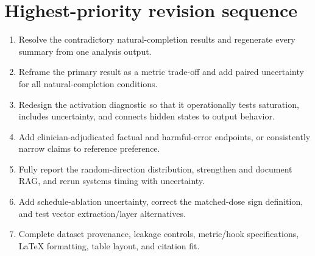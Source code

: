 \documentclass[11pt]{article}
\begin{document}
\section*{Highest-priority revision sequence}

\begin{enumerate}
    \item Resolve the contradictory natural-completion results and regenerate every summary from one analysis output.
    \item Reframe the primary result as a metric trade-off and add paired uncertainty for all natural-completion conditions.
    \item Redesign the activation diagnostic so that it operationally tests saturation, includes uncertainty, and connects hidden states to output behavior.
    \item Add clinician-adjudicated factual and harmful-error endpoints, or consistently narrow claims to reference preference.
    \item Fully report the random-direction distribution, strengthen and document RAG, and rerun systems timing with uncertainty.
    \item Add schedule-ablation uncertainty, correct the matched-dose sign definition, and test vector extraction/layer alternatives.
    \item Complete dataset provenance, leakage controls, metric/hook specifications, LaTeX formatting, table layout, and citation fit.
\end{enumerate}
\end{document}
